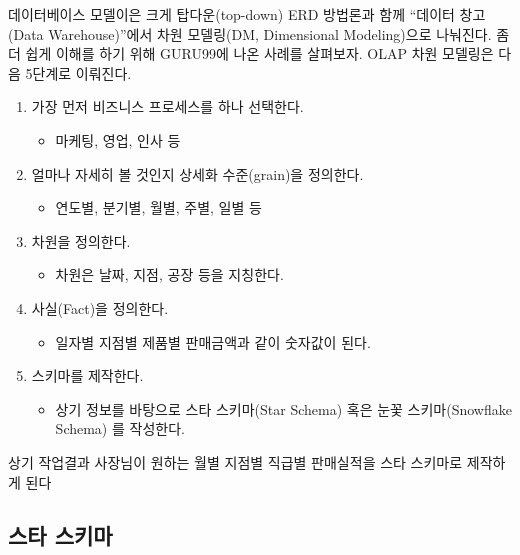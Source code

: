 \documentclass[
  letterpaper,
  chapter,a4paper,showtrims,openright,hidelinks]{oblivoir}
\providecommand{\tightlist}{%
  \setlength{\itemsep}{0pt}\setlength{\parskip}{0pt}}\usepackage{longtable,booktabs,array}
\begin{document}
데이터베이스 모델이은 크게 탑다운(top-down) ERD 방법론과 함께 ``데이터
창고(Data Warehouse)''에서 차원 모델링(DM, Dimensional Modeling)으로
나눠진다. 좀더 쉽게 이해를 하기 위해 GURU99에 나온 사례를 살펴보자. OLAP
차원 모델링은 다음 5단계로 이뤄진다.

\begin{enumerate}
\def\labelenumi{\arabic{enumi}.}
\tightlist
\item
  가장 먼저 비즈니스 프로세스를 하나 선택한다.

  \begin{itemize}
  \tightlist
  \item
    마케팅, 영업, 인사 등
  \end{itemize}
\item
  얼마나 자세히 볼 것인지 상세화 수준(grain)을 정의한다.

  \begin{itemize}
  \tightlist
  \item
    연도별, 분기별, 월별, 주별, 일별 등
  \end{itemize}
\item
  차원을 정의한다.

  \begin{itemize}
  \tightlist
  \item
    차원은 날짜, 지점, 공장 등을 지칭한다.
  \end{itemize}
\item
  사실(Fact)을 정의한다.

  \begin{itemize}
  \tightlist
  \item
    일자별 지점별 제품별 판매금액과 같이 숫자값이 된다.
  \end{itemize}
\item
  스키마를 제작한다.

  \begin{itemize}
  \tightlist
  \item
    상기 정보를 바탕으로 스타 스키마(Star Schema) 혹은 눈꽃
    스키마(Snowflake Schema) 를 작성한다.
  \end{itemize}
\end{enumerate}

상기 작업결과 사장님이 원하는 월별 지점별 직급별 판매실적을 스타
스키마로 제작하게 된다

\href{fig/dimensional_model.png}{}

\hypertarget{star-schema}{%
\subsection{스타 스키마}\label{star-schema}}
\end{document}

